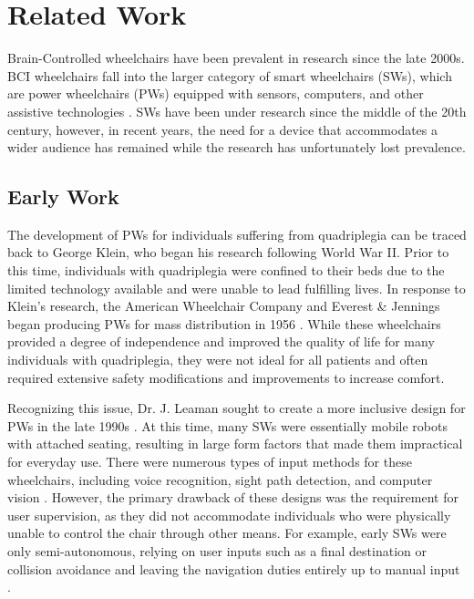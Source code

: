 \documentclass[conference]{IEEEtran}
\begin{document}
\section{Related Work}
Brain-Controlled wheelchairs have been prevalent in research since the late 2000s. BCI wheelchairs fall into the larger category of smart wheelchairs (SWs), which are power wheelchairs (PWs) equipped with sensors, computers, and other assistive technologies \cite{a_comprehensive_review}. SWs have been under research since the middle of the 20th century, however, in recent years, the need for a device that accommodates a wider audience has remained while the research has unfortunately lost prevalence.  

    \subsection{Early Work}
    The development of PWs for individuals suffering from quadriplegia can be traced back to George Klein, who began his research following World War II. Prior to this time, individuals with quadriplegia were confined to their beds due to the limited technology available and were unable to lead fulfilling lives. In response to Klein's research, the American Wheelchair Company and Everest \& Jennings began producing PWs for mass distribution in 1956 \cite{a_comprehensive_review}. While these wheelchairs provided a degree of independence and improved the quality of life for many individuals with quadriplegia, they were not ideal for all patients and often required extensive safety modifications and improvements to increase comfort.

    Recognizing this issue, Dr. J. Leaman sought to create a more inclusive design for PWs in the late 1990s \cite{a_comprehensive_review}. At this time, many SWs were essentially mobile robots with attached seating, resulting in large form factors that made them impractical for everyday use. There were numerous types of input methods for these wheelchairs, including voice recognition, sight path detection, and computer vision \cite{smart_wheelchairs}. However, the primary drawback of these designs was the requirement for user supervision, as they did not accommodate individuals who were physically unable to control the chair through other means. For example, early SWs were only semi-autonomous, relying on user inputs such as a final destination or collision avoidance and leaving the navigation duties entirely up to manual input \cite{smart_wheelchairs}. 
    
\end{document}
